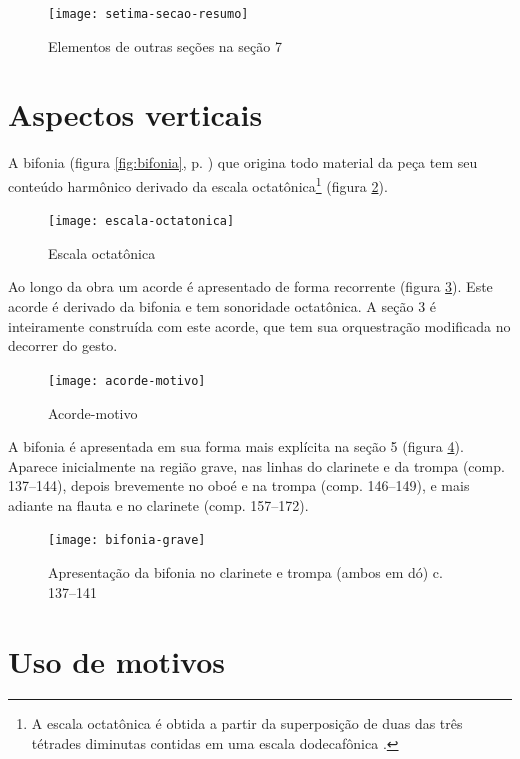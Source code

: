 \begin{figure}
  \centering
  \texttt{[image: setima-secao-resumo]}
  \caption{Elementos de outras seções na seção 7}
  \label{fig:setima-secao-resumo}
\end{figure}
\section{Aspectos verticais}
\label{sec:aspectos-verticais}

A bifonia (figura \ref{fig:bifonia}, p. \pageref{fig:bifonia}) que
origina todo material da peça tem seu conteúdo harmônico derivado da
escala octatônica\footnote{A escala octatônica é obtida a partir da
  superposição de duas das três tétrades diminutas contidas em uma
  escala dodecafônica \cite[p. 76]{antokoletz90:music}.} (figura
\ref{fig:escala-octatonica}).

\begin{figure}
  \centering
  \texttt{[image: escala-octatonica]}
  \caption{Escala octatônica}
  \label{fig:escala-octatonica}
\end{figure}

Ao longo da obra um acorde é apresentado de forma recorrente (figura
\ref{fig:acorde-motivo}). Este acorde é derivado da bifonia e tem
sonoridade octatônica. A seção 3 é inteiramente construída com este
acorde, que tem sua orquestração modificada no decorrer do gesto.

\begin{figure}
  \centering
  \texttt{[image: acorde-motivo]}
  \caption{Acorde-motivo}
  \label{fig:acorde-motivo}
\end{figure}

A bifonia é apresentada em sua forma mais explícita na seção 5 (figura
\ref{fig:bifonia-grave}). Aparece inicialmente na região grave, nas
linhas do clarinete e da trompa (comp. 137--144), depois brevemente no
oboé e na trompa (comp. 146--149), e mais adiante na flauta e no
clarinete (comp. 157--172).

\begin{figure}
  \centering
  \texttt{[image: bifonia-grave]}
  \caption{Apresentação da bifonia no clarinete e trompa (ambos em
    dó) c. 137--141}
  \label{fig:bifonia-grave}
\end{figure}
\section{Uso de motivos}
\label{sec:uso-de-motivos}

